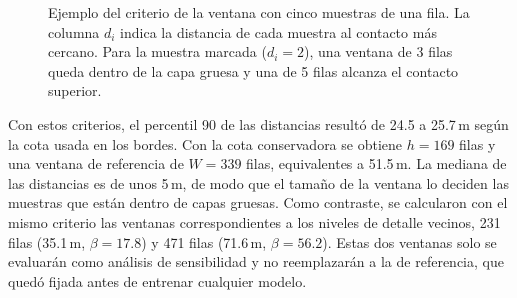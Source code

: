 \documentclass[11pt,a4paper]{article}
\begin{document}
\begin{figure}[htbp]
\centering
{}
\caption{Ejemplo del criterio de la ventana con cinco muestras de una fila. La columna $d_i$ indica la distancia de cada muestra al contacto más cercano. Para la muestra marcada ($d_i = 2$), una ventana de 3 filas queda dentro de la capa gruesa y una de 5 filas alcanza el contacto superior.}
\label{fig:criterio-w}
\end{figure}

Con estos criterios, el percentil 90 de las distancias resultó de 24.5 a 25.7\,m según la cota usada en los bordes. Con la cota conservadora se obtiene $h = 169$ filas y una ventana de referencia de $W = 339$ filas, equivalentes a 51.5\,m. La mediana de las distancias es de unos 5\,m, de modo que el tamaño de la ventana lo deciden las muestras que están dentro de capas gruesas. Como contraste, se calcularon con el mismo criterio las ventanas correspondientes a los niveles de detalle vecinos, 231 filas (35.1\,m, $\beta = 17.8$) y 471 filas (71.6\,m, $\beta = 56.2$). Estas dos ventanas solo se evaluarán como análisis de sensibilidad y no reemplazarán a la de referencia, que quedó fijada antes de entrenar cualquier modelo.
\end{document}
